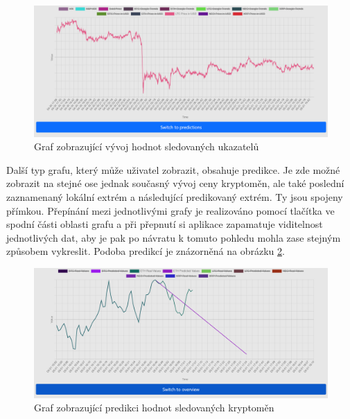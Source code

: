 \begin{figure}
    \caption{Graf zobrazující vývoj hodnot sledovaných ukazatelů}
    \label{visual:overview}
    \centering
    \includegraphics[width=\textwidth]{overview.png}
\end{figure}

Další typ grafu, který může uživatel zobrazit, obsahuje predikce. 
Je zde možné zobrazit na stejné ose jednak současný vývoj ceny kryptoměn, ale také poslední zaznamenaný lokální extrém a následující predikovaný extrém. 
Ty jsou spojeny přímkou. 
Přepínání mezi jednotlivými grafy je realizováno pomocí tlačítka ve spodní části oblasti grafu a při přepnutí si aplikace zapamatuje viditelnost jednotlivých dat, aby je pak po návratu k tomuto pohledu mohla zase stejným způsobem vykreslit.
Podoba predikcí je znázorněná na obrázku \ref{visual:predictions}.

\begin{figure}
    \caption{Graf zobrazující predikci hodnot sledovaných kryptoměn}
    \label{visual:predictions}
    \centering
    \includegraphics[width=\textwidth]{predictions.png}
\end{figure}

